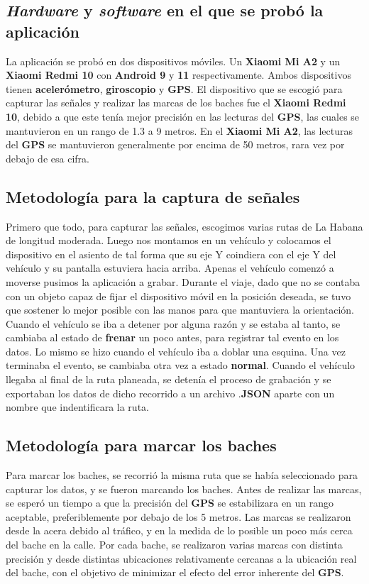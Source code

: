 	\subsection{\emph{Hardware} y \emph{software} en el que se probó la aplicación}
		La aplicación se probó en dos dispositivos móviles. Un \textbf{Xiaomi Mi A2} y un \textbf{Xiaomi Redmi 10} con \textbf{Android 9} y
		\textbf{11} respectivamente. Ambos dispositivos tienen \textbf{acelerómetro}, \textbf{giroscopio} y \textbf{GPS}. El dispositivo que 
		se escogió para capturar las señales y realizar las marcas de los baches fue el \textbf{Xiaomi Redmi 10}, debido a que este tenía mejor
		precisión en las lecturas del \textbf{GPS}, las cuales se mantuvieron en un rango de 1.3 a 9 metros. En el \textbf{Xiaomi Mi A2}, las 
		lecturas del \textbf{GPS} se mantuvieron generalmente por encima de 50 metros, rara vez por debajo de esa cifra.

	\subsection{Metodología para la captura de señales}
		Primero que todo, para capturar las señales, escogimos varias rutas de La Habana de longitud moderada. Luego nos montamos en un vehículo
		y colocamos el dispositivo en el asiento de tal forma que su eje Y coindiera con el eje Y del vehículo y su pantalla estuviera hacia arriba.
		Apenas el vehículo comenzó a moverse pusimos la aplicación a grabar. Durante el viaje, dado que no se contaba con un objeto capaz de fijar el
		dispositivo móvil en la posición deseada, se tuvo que sostener lo mejor posible con las manos para que mantuviera la orientación. \\
		\indent Cuando el vehículo se iba a detener por alguna razón y se estaba al tanto, se cambiaba al estado de \textbf{frenar} un poco antes, para
		registrar tal evento en los datos. Lo mismo se hizo cuando el vehículo iba a doblar una esquina. Una vez terminaba el evento, se cambiaba otra
		vez a estado \textbf{normal}. Cuando el vehículo llegaba al final de la ruta planeada, se detenía el proceso de grabación y se exportaban los
		datos de dicho recorrido a un archivo .\textbf{JSON} aparte con un nombre que indentificara la ruta.

	\subsection{Metodología para marcar los baches}
		Para marcar los baches, se recorrió la misma ruta que se había seleccionado para capturar los datos, y se fueron marcando los baches. Antes 
		de realizar las marcas, se esperó un tiempo a que la precisión del \textbf{GPS} se estabilizara en un rango aceptable, preferiblemente por debajo 
		de los 5 metros. Las marcas se realizaron desde la acera debido al tráfico, y en la medida de lo posible un poco más cerca del bache en la calle.
		Por cada bache, se realizaron varias marcas con distinta precisión y desde distintas ubicaciones relativamente cercanas a la ubicación real del
		bache, con el objetivo de minimizar el efecto del error inherente del \textbf{GPS}.

